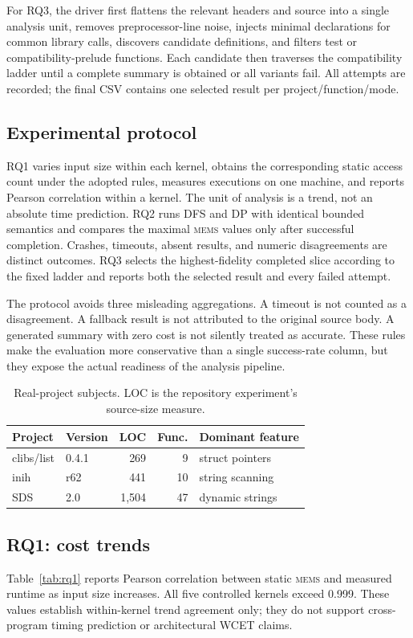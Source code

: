 \documentclass[10pt,conference]{IEEEtran}
\newcommand{\mems}{\textsc{mems}\xspace}
\begin{document}
For RQ3, the driver first flattens the relevant headers and source into a single analysis unit, removes preprocessor-line noise, injects minimal declarations for common library calls, discovers candidate definitions, and filters test or compatibility-prelude functions. Each candidate then traverses the compatibility ladder until a complete summary is obtained or all variants fail. All attempts are recorded; the final CSV contains one selected result per project/function/mode.

\subsection{Experimental protocol}
RQ1 varies input size within each kernel, obtains the corresponding static access count under the adopted rules, measures executions on one machine, and reports Pearson correlation within a kernel. The unit of analysis is a trend, not an absolute time prediction. RQ2 runs DFS and DP with identical bounded semantics and compares the maximal \mems values only after successful completion. Crashes, timeouts, absent results, and numeric disagreements are distinct outcomes. RQ3 selects the highest-fidelity completed slice according to the fixed ladder and reports both the selected result and every failed attempt.

The protocol avoids three misleading aggregations. A timeout is not counted as a disagreement. A fallback result is not attributed to the original source body. A generated summary with zero cost is not silently treated as accurate. These rules make the evaluation more conservative than a single success-rate column, but they expose the actual readiness of the analysis pipeline.

\begin{table}[t]
\centering
\caption{Real-project subjects. LOC is the repository experiment's source-size measure.}
\label{tab:subjects}
\begin{tabular}{llrrl}
\toprule
Project & Version & LOC & Func. & Dominant feature\\
\midrule
clibs/list & 0.4.1 & 269 & 9 & struct pointers\\
inih & r62 & 441 & 10 & string scanning\\
SDS & 2.0 & 1,504 & 47 & dynamic strings\\
\bottomrule
\end{tabular}
\end{table}

\subsection{RQ1: cost trends}
Table~\ref{tab:rq1} reports Pearson correlation between static \mems and measured runtime as input size increases. All five controlled kernels exceed 0.999. These values establish within-kernel trend agreement only; they do not support cross-program timing prediction or architectural WCET claims.
\end{document}
